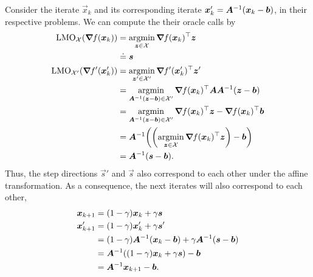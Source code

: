 Consider the iterate $\vec{x}_k$ and its corresponding iterate $\bm{x}'_k = \bm{A}^{-1}
    (\bm{x}_k - \bm{b})$, in their respective problems. We can compute the their oracle calls by
\begin{align*}
    \mathrm{LMO}_{\mathcal{X}}(\grad{f(\vec{x}_k)}{})    & = \argmin_{\vec{z} \in \mathcal{X}} \transpose{\grad{f(\vec{x}_k)}{}} \vec{z}                                                                        \\
                                                         & \doteq \vec{s}                                                                                                                                       \\
    \mathrm{LMO}_{\mathcal{X}'}(\grad{f'(\vec{x}'_k)}{}) & = \argmin_{\vec{z}' \in \mathcal{X}'} \transpose{\grad{f'(\vec{x}'_k)}{}} \vec{z}'                                                                   \\
                                                         & = \argmin_{\inv{\mat{A}} (\vec{z} - \vec{b}) \in \mathcal{X}'} \transpose{\grad{f(\vec{x}_k)}{}} \mat{A} \inv{\mat{A}} (\vec{z} - \vec{b})           \\
                                                         & = \argmin_{\inv{\mat{A}} (\vec{z} - \vec{b}) \in \mathcal{X}'} \transpose{\grad{f(\vec{x}_k)}{}} \vec{z} - \transpose{\grad{f(\vec{x}_k)}{}} \vec{b} \\
                                                         & = \inv{\mat{A}} \lft( \lft(\argmin_{\vec{z} \in \mathcal{X}} \transpose{\grad{f(\vec{x}_k)}{}} \vec{z}\rgt) - \vec{b} \rgt)                          \\
                                                         & = \inv{\mat{A}} (\vec{s} - \vec{b}).
\end{align*}
Thus, the step directions $\vec{s}'$ and $\vec{s}$ also correspond to each other under the affine
transformation. As a consequence, the next iterates will also correspond to each other,
\begin{align*}
    \bm{x}_{k+1}  & = (1- \gamma) \bm{x}_k + \gamma \bm{s}                                                     \\
    \bm{x}'_{k+1} & = (1- \gamma) \bm{x}'_k + \gamma \bm{s}'                                                   \\
                   & = (1- \gamma) \bm{A}^{-1} (\bm{x}_k - \bm{b}) + \gamma \bm{A}^{-1} (\bm{s} - \bm{b}) \\
                   & = \bm{A}^{-1} ((1-\gamma)\bm{x}_k + \gamma \bm{s}) - \bm{b}                             \\
                   & = \bm{A}^{-1} \bm{x}_{k+1} - \bm{b}.
\end{align*}


